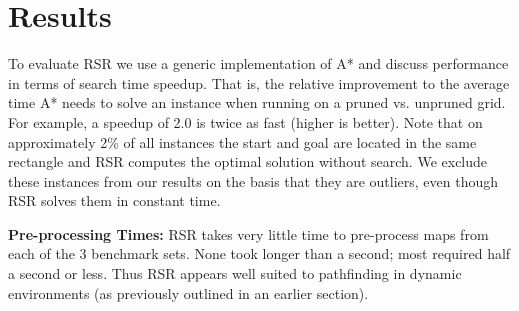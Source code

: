 \section{Results}
\label{sec-results}
To evaluate RSR we use a generic implementation of A* and discuss performance 
in terms of search time speedup. That is, the relative improvement to the average 
time A* needs to solve an instance when running on a pruned  vs. unpruned grid.
For example, a speedup of 2.0 is twice as fast (higher is better).
%
Note that on approximately 2\% of all instances the start and goal are located
in the same rectangle and RSR computes the optimal solution without
search.  We exclude these instances from our results on the basis that they are 
outliers, even though RSR solves them in constant time.



\textbf{Pre-processing Times: } 
RSR takes very little time to pre-process maps from each of the 3
benchmark sets.
None took longer than a second; most required half a second or less.
Thus RSR appears well suited to
pathfinding in dynamic environments (as previously outlined in an earlier
section).

